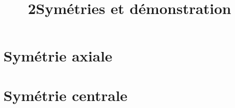 \documentclass[12pt,a4paper]{article}
\date{}
\title{\textcircled{{\normalsize{2}}}Symétries et démonstration}
\begin{document}
\maketitle








\section{Symétrie axiale}





\section{Symétrie centrale}



%
%
%
%
%
%
%
%
%
\end{document}
